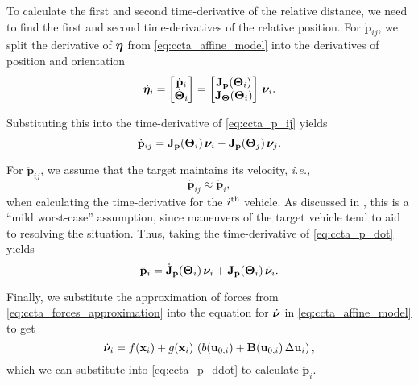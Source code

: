To calculate the first and second time-derivative of the relative distance, we need to find the first and second time-derivatives of the relative position.
For $\dot{\mathbf{p}}_{ij}$, we split the derivative of $\bm{\eta}$ from \eqref{eq:ccta_affine_model} into the derivatives of position and orientation \vspace{-2mm}
\begin{equation}
    \dot{\bm{\eta}}_{i} = \begin{bmatrix} \dot{\mathbf{p}}_{i} \\ \dot{\bm{\Theta}}_{i} \end{bmatrix} = \begin{bmatrix}
        \mathbf{J}_{\mathbf{p}}(\bm{\Theta}_{i}) \\ \mathbf{J}_{\bm{\Theta}}(\bm{\Theta}_{i})
    \end{bmatrix}\,\bm{\nu}_{i}.
\end{equation}

\noindent Substituting this into the time-derivative of \eqref{eq:ccta_p_ij} yields
\begin{equation}
    \dot{\mathbf{p}}_{ij} = \mathbf{J}_{\mathbf{p}}(\bm{\Theta}_{i}) \, \bm{\nu}_{i} - \mathbf{J}_{\mathbf{p}}(\bm{\Theta}_{j}) \, \bm{\nu}_{j}.
    \label{eq:ccta_p_dot}
\end{equation}

\noindent For $\ddot{\mathbf{p}}_{ij}$, we assume that the target maintains its velocity, \emph{i.e.,}
\begin{equation}
    \ddot{\mathbf{p}}_{ij} \approx \ddot{\mathbf{p}}_{i},
\end{equation}
when calculating the time-derivative for the $i^{\rm th}$ vehicle.
As discussed in \cite{thyri_reactive_2020}, this is a ``mild worst-case'' assumption, since maneuvers of the target vehicle tend to aid to resolving the situation.
Thus, taking the time-derivative of \eqref{eq:ccta_p_dot} yields
\begin{equation}
    \ddot{\mathbf{p}}_{i} = \dot{\mathbf{J}}_{\mathbf{p}}(\bm{\Theta}_{i}) \, \bm{\nu}_{i} + \mathbf{J}_{\mathbf{p}}(\bm{\Theta}_{i}) \, \dot{\bm{\nu}}_{i}.
    \label{eq:ccta_p_ddot}
\end{equation}

Finally, we substitute the approximation of forces from \eqref{eq:ccta_forces_approximation} into the equation for $\dot{\bm{\nu}}$ in \eqref{eq:ccta_affine_model} to get
\begin{equation}
    \dot{\bm{\nu}}_{i} = f(\mathbf{x}_{i}) + g(\mathbf{x}_{i})\,\left(b(\mathbf{u}_{0,i}) + \mathbf{B}(\mathbf{u}_{0,i})\,\Delta\mathbf{u}_{i}\right),
\end{equation}
which we can substitute into \eqref{eq:ccta_p_ddot} to calculate $\ddot{\mathbf{p}}_{i}$.

